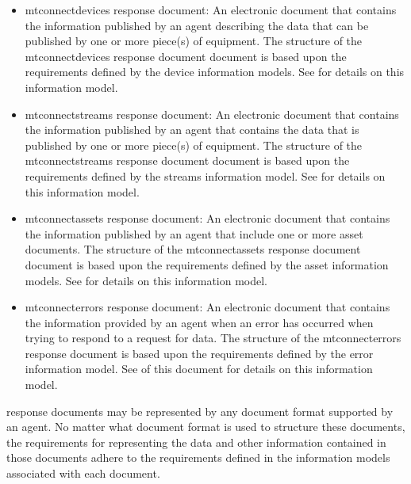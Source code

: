 \begin{itemize}

\item \gls{mtconnectdevices response document}:  An electronic document that contains the information published by an \gls{agent} describing the data that can be published by one or more piece(s) of equipment.  The structure of the \gls{mtconnectdevices response document} document is based upon the requirements defined by the \glspl{device information model}.  See  for details on this information model.

\item \gls{mtconnectstreams response document}:  An electronic document that contains the information published by an \gls{agent} that contains the data that is published by one or more piece(s) of equipment.  The structure of the \gls{mtconnectstreams response document} document is based upon the requirements defined by the \gls{streams information model}.  See  for details on this information model.

\item \gls{mtconnectassets response document}:  An electronic document that contains the information published by an \gls{agent} that \MAY include one or more \glspl{asset document}.  The structure of the \gls{mtconnectassets response document} document is based upon the requirements defined by the \glspl{asset information model}.  See  for details on this information model.

\item \gls{mtconnecterrors response document}:  An electronic document that contains the information provided by an \gls{agent} when an error has occurred when trying to respond to a \gls{request} for data.  The structure of the \gls{mtconnecterrors response document} is based upon the requirements defined by the \gls{error information model}.  See  of this document for details on this information model.

\end{itemize}

\glspl{response document} may be represented by any document format supported by an \gls{agent}.  No matter what document format is used to structure these documents, the requirements for representing the data and other information contained in those documents \MUST adhere to the requirements defined in the \glspl{information model} associated with each document.

